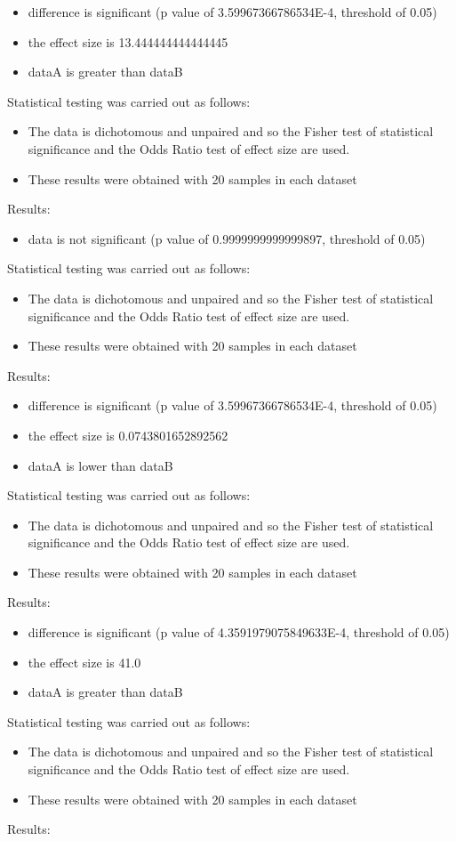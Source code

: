 \documentclass[]{article}
\begin{document}
\begin{itemize}
\item{difference is significant (p value of 3.59967366786534E-4, threshold of 0.05)}
\item{the effect size is 13.444444444444445}
\item{dataA is greater than dataB}
\end{itemize}Statistical testing was carried out as follows: \begin{itemize}
\item{The data is dichotomous and unpaired and so the Fisher test of statistical significance and the Odds Ratio test of effect size are used.}
\item{These results were obtained with 20 samples in each dataset}
\end{itemize}Results:
\begin{itemize}
\item{data is not significant (p value of 0.9999999999999897, threshold of 0.05)}
\end{itemize}Statistical testing was carried out as follows: \begin{itemize}
\item{The data is dichotomous and unpaired and so the Fisher test of statistical significance and the Odds Ratio test of effect size are used.}
\item{These results were obtained with 20 samples in each dataset}
\end{itemize}Results:
\begin{itemize}
\item{difference is significant (p value of 3.59967366786534E-4, threshold of 0.05)}
\item{the effect size is 0.0743801652892562}
\item{dataA is lower than dataB}
\end{itemize}Statistical testing was carried out as follows: \begin{itemize}
\item{The data is dichotomous and unpaired and so the Fisher test of statistical significance and the Odds Ratio test of effect size are used.}
\item{These results were obtained with 20 samples in each dataset}
\end{itemize}Results:
\begin{itemize}
\item{difference is significant (p value of 4.3591979075849633E-4, threshold of 0.05)}
\item{the effect size is 41.0}
\item{dataA is greater than dataB}
\end{itemize}Statistical testing was carried out as follows: \begin{itemize}
\item{The data is dichotomous and unpaired and so the Fisher test of statistical significance and the Odds Ratio test of effect size are used.}
\item{These results were obtained with 20 samples in each dataset}
\end{itemize}Results:
\end{document}
